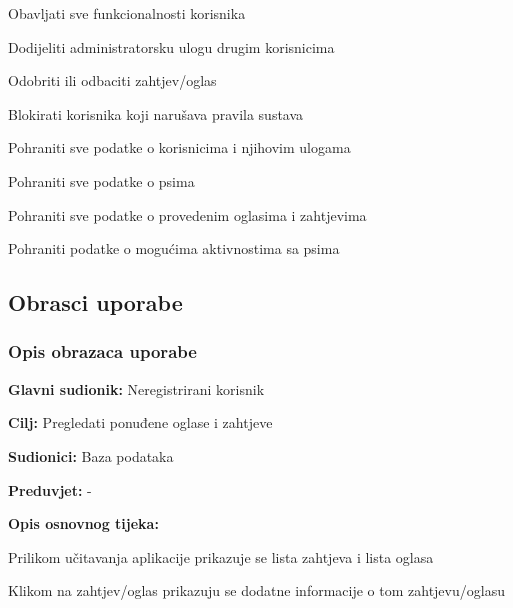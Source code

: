 \begin{packed_enum}
				\item {}
				\begin{packed_enum}
					\item Obavljati sve funkcionalnosti korisnika
					\item Dodijeliti administratorsku ulogu drugim korisnicima
					\item Odobriti ili odbaciti zahtjev/oglas
					\item Blokirati korisnika koji narušava pravila sustava
				\end{packed_enum}
			
				\item {}
				\begin{packed_enum}
					\item Pohraniti sve podatke o korisnicima i njihovim ulogama
					\item Pohraniti sve podatke o psima
					\item Pohraniti sve podatke o provedenim oglasima i zahtjevima
					\item Pohraniti podatke o mogućima aktivnostima sa psima
				\end{packed_enum}
			
			\end{packed_enum}
			
			\eject 
			
			
				
			\subsection{Obrasci uporabe}
				
				\subsubsection{Opis obrazaca uporabe}					

					\noindent {}
					\begin{packed_item}
	
						\item \textbf{Glavni sudionik: } Neregistrirani korisnik 
						\item  \textbf{Cilj:} Pregledati ponuđene oglase i zahtjeve
						\item  \textbf{Sudionici:} Baza podataka 
						\item  \textbf{Preduvjet:} -
						\item  \textbf{Opis osnovnog tijeka:}
						
						\item[] \begin{packed_enum}
	
							\item Prilikom učitavanja aplikacije prikazuje se lista zahtjeva i lista oglasa
							\item Klikom na zahtjev/oglas prikazuju se dodatne informacije o tom zahtjevu/oglasu
				
						\end{packed_enum}
					\end{packed_item}
					
